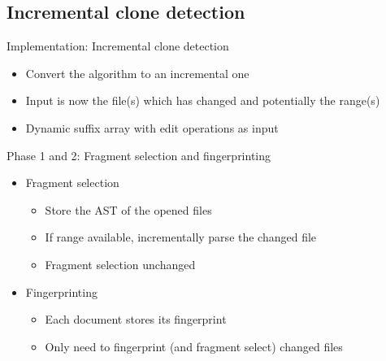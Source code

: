 \documentclass[aspectratio=1610, xcolor=table]{beamer}
\begin{document}
\subsection{Incremental clone detection}
\begin{frame}{Implementation: Incremental clone detection}
    \begin{itemize}
        \item Convert the algorithm to an incremental one
        \item Input is now the file(s) which has changed and potentially the range(s)
        \item Dynamic suffix array with edit operations as input
    \end{itemize}
\end{frame}

\begin{frame}{Phase 1 and 2: Fragment selection and fingerprinting}
    \begin{itemize}
        \item Fragment selection
    \begin{itemize}
        \item Store the AST of the opened files
        \item If range available, incrementally parse the changed file
        \item Fragment selection unchanged
    \end{itemize}
\item Fingerprinting
    \begin{itemize}
        \item Each document stores its fingerprint
        \item Only need to fingerprint (and fragment select) changed files
    \end{itemize}
    \end{itemize}
\end{frame}
\end{document}
